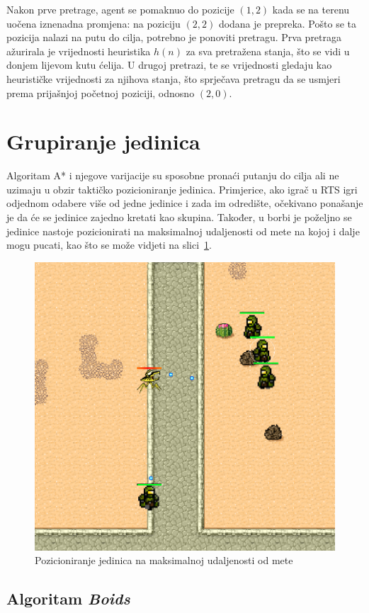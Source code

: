 \documentclass[times, utf8, zavrsni, numeric]{fer}
\begin{document}
Nakon prve pretrage, agent se pomaknuo do pozicije \((1, 2)\) kada se na  terenu uočena iznenadna promjena: na poziciju \((2, 2)\) dodana je prepreka.
Pošto se ta pozicija nalazi na putu do cilja, potrebno je ponoviti pretragu.
Prva pretraga ažurirala je vrijednosti heuristika \(h(n)\) za sva pretražena stanja, što se vidi u donjem lijevom kutu ćelija.
U drugoj pretrazi, te se vrijednosti gledaju kao heurističke vrijednosti za njihova stanja, što sprječava pretragu da se usmjeri prema prijašnjoj početnoj poziciji, odnosno \((2, 0)\).

\section{Grupiranje jedinica}\label{sec:grouping}

\par Algoritam A* i njegove varijacije su sposobne pronaći putanju do cilja ali ne uzimaju u obzir taktičko pozicioniranje jedinica. 
Primjerice, ako igrač u RTS igri odjednom odabere više od jedne jedinice i zada im odredište, očekivano ponašanje je da će se jedinice zajedno kretati kao skupina. 
Također, u borbi je poželjno se jedinice nastoje pozicionirati na maksimalnoj udaljenosti od mete na kojoj i dalje mogu pucati, kao što se može vidjeti na slici~\ref{fig:enemySeparation}.

\begin{figure}[h]
	\centering
	\includegraphics[width=0.5\linewidth]{images/enemySeparation.png}
	\caption{Pozicioniranje jedinica na maksimalnoj udaljenosti od mete}
	\label{fig:enemySeparation}
\end{figure}


\subsection{Algoritam \textit{Boids}}\label{ssec:boids}
\end{document}
